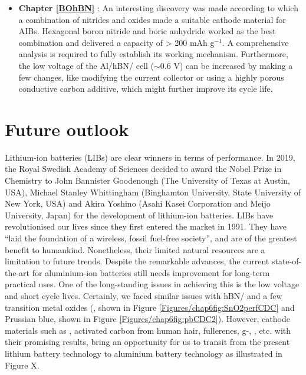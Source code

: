 \begin{itemize}
\item \textbf{Chapter \ref{BOhBN}} : An interesting discovery was made according to which a combination of nitrides and oxides made a suitable cathode material for AIBs. Hexagonal boron nitride and boric anhydride worked as the best combination and delivered a capacity of > 200 mAh g$^{-1}$. A comprehensive analysis is required to fully establish its working mechanism. Furthermore, the low voltage of the Al/hBN/ cell ($\sim$0.6 V) can be increased by making a few changes, like modifying the current collector or using a highly porous conductive carbon additive, which might further improve its cycle life. 
\end{itemize}

\section{Future outlook}
Lithium-ion batteries (LIBs) are clear winners in terms of performance. In 2019, the Royal Swedish Academy of Sciences decided to award the Nobel Prize in Chemistry to John Bannister Goodenough (The University of Texas at Austin, USA), Michael Stanley Whittingham (Binghamton University, State University of New York, USA) and Akira Yoshino (Asahi Kasei Corporation and Meijo University, Japan) for the development of lithium-ion batteries. LIBs have revolutionised our lives since they first entered the market in 1991. They have \enquote{laid the foundation of a wireless, fossil fuel-free society}, and are of the greatest benefit to humankind. Nonetheless, their limited natural resources are a limitation to future trends. 
Despite the remarkable advances, the current state-of-the-art for aluminium-ion batteries still needs improvement for long-term practical uses. One of the long-standing issues in achieving this is the low voltage and short cycle lives. Certainly, we faced similar issues with hBN/ and a few transition metal oxides (, shown in Figure \ref{Figures/chap6fig:SnO2perfCDC} and Prussian blue, shown in Figure \ref{Figures/chap6fig:pbCDC2}). However, cathode materials such as \cite{divya_molybdenum_2019-1}, activated carbon from human hair, fullerenes, g-, , etc. with their promising results, bring an opportunity for us to transit from the present lithium battery technology to aluminium battery technology as illustrated in Figure X.

